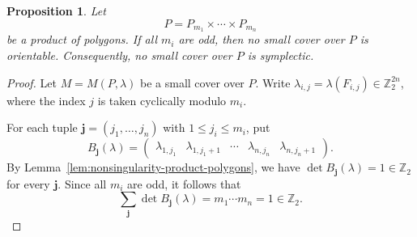 \documentclass{amsart}
\newtheorem{proposition}[theorem]{Proposition}
\numberwithin{equation}{section}
\theoremstyle{definition}
\theoremstyle{remark}
\newcommand{\Z}{\mathbb Z}
\newcommand{\bj}{\mathbf j}
\begin{document}
\begin{proposition}\label{prop:all-odd-polygons-not-orientable}
Let
$$
    P=P_{m_1}\times\cdots\times P_{m_n}
$$
be a product of polygons.
If all $m_i$ are odd, then no small cover over $P$ is orientable.
Consequently, no small cover over $P$ is symplectic.
\end{proposition}

\begin{proof}
    Let $M=M(P,\lambda)$ be a small cover over $P$.
    Write $\lambda_{i,j}=\lambda(F_{i,j})\in \Z_2^{2n}$, where the index $j$ is taken cyclically modulo $m_i$.
    
    For each tuple $\bj=(j_1,\ldots,j_n)$ with $1\leq j_i\leq m_i$, put
    $$
        B_{\bj}(\lambda) = \begin{pmatrix} \lambda_{1,j_1} & \lambda_{1,j_1+1} & \cdots & \lambda_{n,j_n} & \lambda_{n,j_n+1} \end{pmatrix}.
    $$
    By Lemma~\ref{lem:nonsingularity-product-polygons}, we have $\det B_{\bj}(\lambda)=1 \in \Z_2$ for every $\bj$.
    Since all $m_i$ are odd, it follows that
    \begin{equation}\label{eq:odd-det-sum}
        \sum_{\bj}\det B_{\bj}(\lambda) = m_1\cdots m_n = 1 \in \Z_2.
    \end{equation}
    

\end{proof}
\end{document}
